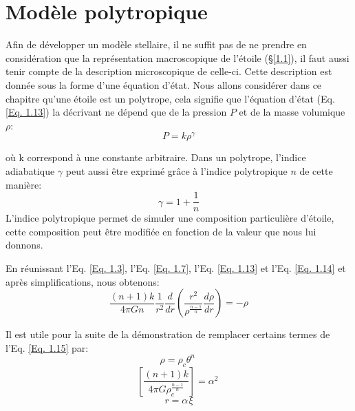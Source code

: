 \section{Modèle polytropique}\label{1.2}

Afin de développer un modèle stellaire, il ne suffit pas de ne prendre en considération que la représentation macroscopique de l'étoile (§\ref{1.1}), il faut aussi tenir compte de la description microscopique de celle-ci. Cette description est donnée sous la forme d'une équation d'état. Nous allons considérer dans ce chapitre qu'une étoile est un polytrope, cela signifie que l'équation d'état (Eq. \ref{Eq. 1.13}) la décrivant ne dépend que de la pression $P$ et de la masse volumique $\rho$:\begin{equation}P=k\rho^{\gamma}\label{Eq. 1.13}\end{equation}

où k correspond à une constante arbitraire. Dans un polytrope, l'indice adiabatique $\gamma$ peut aussi être exprimé grâce à l'indice polytropique $n$ de cette manière:\begin{equation}\gamma=1+\dfrac{1}{n}\label{Eq. 1.14}\end{equation} L'indice polytropique permet de simuler une composition particulière d'étoile, cette composition peut être modifiée en fonction de la valeur que nous lui donnons. \bigskip

En réunissant l'Eq. \ref{Eq. 1.3}, l'Eq. \ref{Eq. 1.7}, l'Eq. \ref{Eq. 1.13} et l'Eq. \ref{Eq. 1.14} et après simplifications, nous obtenons\footnotemark[5]:\begin{equation}\dfrac{(n+1)k}{4\pi Gn}\dfrac{1}{r^{2}}\dfrac{d}{dr}\left( \dfrac{r^{2}}{\rho^{\frac{n-1}{n}}}\dfrac{d\rho}{dr}\right) =-\rho\label{Eq. 1.15}\end{equation}

\vfill
{}

\newpage

Il est utile pour la suite de la démonstration de remplacer certains termes de l'Eq. \ref{Eq. 1.15} par:
\begin{equation}\rho=\rho_{c} \theta^{n}\hspace{3pt}\label{Eq. 1.16}\end{equation}
\begin{equation}\left[\dfrac{(n+1)k}{4\pi G\rho^{\frac{n-1}{n}}_{c}}\right]=\alpha^{2}\hspace{3pt}\label{Eq. 1.17}\end{equation} 
\begin{equation}r=\alpha\hspace{1pt}\xi\label{Eq. 1.18}\end{equation}

